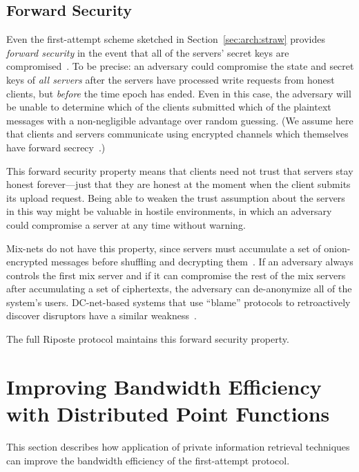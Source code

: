 \documentclass[10pt,twocolumn]{article}
\newcommand{\name}{Riposte\xspace}
\begin{document}
 


\subsection{Forward Security}
\label{sec:arch:forward}

Even the first-attempt scheme
sketched in Section~\ref{sec:arch:straw} provides
{\em forward security} in the event that all
of the servers' secret keys are compromised~\cite{canetti2003forward}.
To be precise: an adversary could compromise the
state and secret keys of {\em all servers} after the servers
have processed  write requests from honest clients, 
but {\em before} the time epoch has ended.
Even in this case, 
the adversary will be unable to determine which of the
 clients submitted which of the  plaintext
messages with a non-negligible advantage over random guessing.
(We assume here that clients and servers
communicate using encrypted channels which themselves
have forward secrecy~\cite{rfc7296}.)

This forward security property means that clients need not
trust that  servers stay honest forever---just that they
are honest at the moment when the client submits its upload request.
Being able to weaken the trust assumption about the servers
in this way might be valuable in hostile environments, in which
an adversary could compromise a server at any time without warning.

Mix-nets do not have this property, since servers must accumulate
a set of onion-encrypted messages before shuffling and
decrypting them~\cite{chaum1981untraceable}. 
If an adversary always controls the first mix server
and if it can compromise the rest of the mix servers after
accumulating a set of ciphertexts,
the adversary can de-anonymize all of the system's users.
DC-net-based systems that use ``blame'' protocols to 
retroactively discover disruptors have a similar 
weakness~\cite{corrigangibbs2010dissent,wolinsky2012dissent}.

The full \name protocol
maintains this forward security property.

 \section{Improving Bandwidth Efficiency with Distributed Point Functions}
\label{sec:dpf}

This section describes how application of private
information retrieval techniques can improve the bandwidth
efficiency of the first-attempt protocol.
\end{document}
